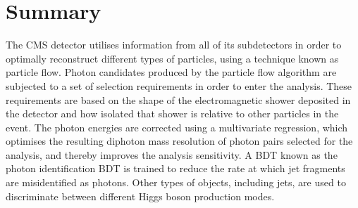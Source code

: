 \section{Summary}

The CMS detector utilises information from all of its subdetectors in order to optimally reconstruct
different types of particles, using a technique known as particle flow.
Photon candidates produced by the particle flow algorithm are subjected to a set of selection 
requirements in order to enter the \Hgg analysis. 
These requirements are based on the shape of the electromagnetic shower deposited in the detector 
and how isolated that shower is relative to other particles in the event.
The photon energies are corrected using a multivariate regression, 
which optimises the resulting diphoton mass resolution of photon pairs selected for the analysis, 
and thereby improves the analysis sensitivity.
A BDT known as the photon identification BDT is trained to reduce the rate at which
jet fragments are misidentified as photons.
Other types of objects, including jets, are used to discriminate 
between different Higgs boson production modes.
